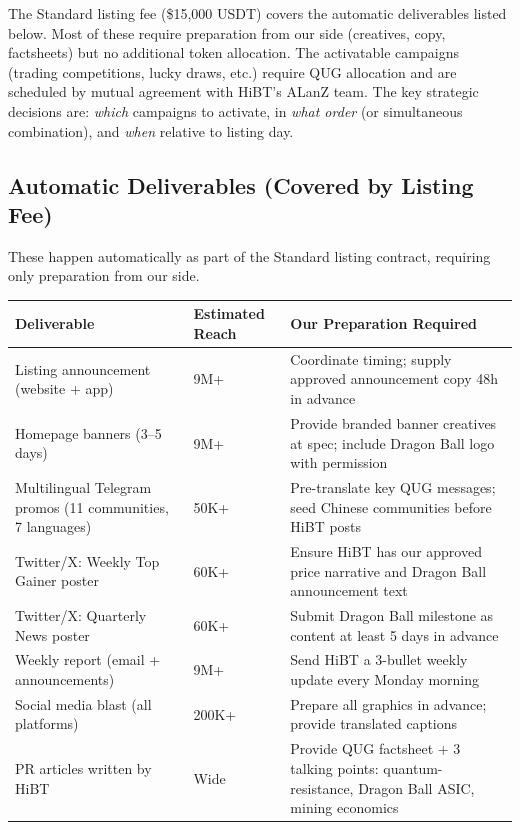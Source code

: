 \documentclass[11pt,a4paper]{article}
\begin{document}
The Standard listing fee (\$15,000 USDT) covers the automatic deliverables listed below. Most of these require preparation from our side (creatives, copy, factsheets) but no additional token allocation. The activatable campaigns (trading competitions, lucky draws, etc.) require QUG allocation and are scheduled by mutual agreement with HiBT's ALanZ team. The key strategic decisions are: \emph{which} campaigns to activate, in \emph{what order} (or simultaneous combination), and \emph{when} relative to listing day.

\subsection{Automatic Deliverables (Covered by Listing Fee)}

These happen automatically as part of the Standard listing contract, requiring only preparation from our side.

\begin{center}
\begin{tabular}{L{5.5cm} C{2.5cm} L{5cm}}
  \toprule
  \textbf{Deliverable} & \textbf{Estimated Reach} & \textbf{Our Preparation Required} \\
  \midrule
  Listing announcement (website + app) & 9M+ & Coordinate timing; supply approved announcement copy 48h in advance \\
  Homepage banners (3--5 days) & 9M+ & Provide branded banner creatives at spec; include Dragon Ball logo with permission \\
  Multilingual Telegram promos (11 communities, 7 languages) & 50K+ & Pre-translate key QUG messages; seed Chinese communities before HiBT posts \\
  Twitter/X: Weekly Top Gainer poster & 60K+ & Ensure HiBT has our approved price narrative and Dragon Ball announcement text \\
  Twitter/X: Quarterly News poster & 60K+ & Submit Dragon Ball milestone as content at least 5 days in advance \\
  Weekly report (email + announcements) & 9M+ & Send HiBT a 3-bullet weekly update every Monday morning \\
  Social media blast (all platforms) & 200K+ & Prepare all graphics in advance; provide translated captions \\
  PR articles written by HiBT & Wide & Provide QUG factsheet + 3 talking points: quantum-resistance, Dragon Ball ASIC, mining economics \\
  \bottomrule
\end{tabular}
\end{center}
\end{document}
